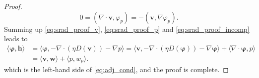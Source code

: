 \documentclass[10pt,a4paper]{amsart}
\begin{document}
\begin{proof}
    \begin{equation}\label{eq:srad_proof_incomp}
     0=(\nabla \cdot \mathbf{v} , \varphi_p)= -(\mathbf{v}, \nabla \varphi_p) .
    \end{equation}
    Summing up \eqref{eq:srad_proof_v}, \eqref{eq:srad_proof_p} and \eqref{eq:srad_proof_incomp} leads to
    \begin{equation}
        \begin{split}
            \langle \boldsymbol{\varphi},\mathbf{h}\rangle 
            &= \langle \boldsymbol{\varphi}, - \nabla \cdot (\eta D(\mathbf{v})) - \nabla p \rangle 
            = \langle \mathbf{v}, - \nabla \cdot (\eta D(\boldsymbol{\varphi}) ) - \nabla \boldsymbol{\varphi} \rangle + \langle \nabla \cdot \boldsymbol{\varphi} , p \rangle \\
            & = \langle \mathbf{v},\mathbf{w}\rangle + \langle p, w_p \rangle.
        \end{split}
    \end{equation}
which is the left-hand side of \eqref{eq:adj_cond}, and the proof is complete.
\end{proof}
\end{document}
